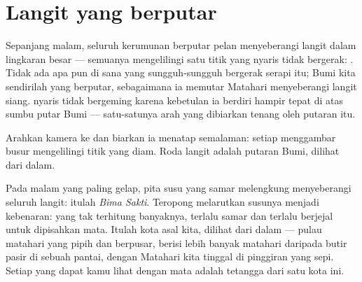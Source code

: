 \section{Langit yang berputar}

\begin{proposition}\label{prop:g5:stars-night-sky:wheel}
Sepanjang malam, seluruh kerumunan  berputar pelan menyeberangi
langit dalam lingkaran besar --- semuanya mengelilingi satu titik yang
nyaris tidak bergerak: . Tidak ada apa pun di sana yang
sungguh-sungguh bergerak serapi itu; Bumi kita sendirilah yang
berputar, sebagaimana ia memutar Matahari menyeberangi langit siang.
 nyaris tidak bergeming karena kebetulan ia berdiri
hampir tepat di atas sumbu putar Bumi --- satu-satunya arah yang
dibiarkan tenang oleh putaran itu.
\end{proposition}

\begin{omfigure}

{\small Arahkan kamera ke  dan biarkan ia menatap
semalaman: setiap  menggambar busur mengelilingi titik yang
diam. Roda langit adalah putaran Bumi, dilihat dari dalam.}
\end{omfigure}

\begin{example}\label{ex:g5:stars-night-sky:milkyway}
Pada malam yang paling gelap, pita susu yang samar melengkung
menyeberangi seluruh langit: itulah
\emph{Bima Sakti}. Teropong melarutkan susunya
menjadi kebenaran:  yang tak terhitung banyaknya, terlalu samar
dan terlalu berjejal untuk dipisahkan mata. Itulah kota asal 
kita, dilihat dari dalam --- pulau matahari yang pipih dan berpusar,
berisi lebih banyak matahari daripada butir pasir di sebuah pantai,
dengan Matahari kita tinggal di pinggiran yang sepi. Setiap 
yang dapat kamu lihat dengan mata adalah tetangga dari satu kota ini.
\end{example}

